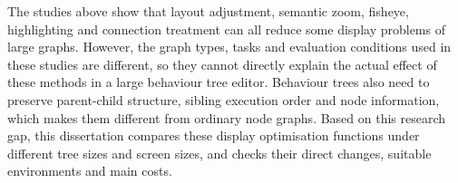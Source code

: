 The studies above show that layout adjustment, semantic zoom, fisheye, highlighting and connection treatment can all reduce some display problems of large graphs. However, the graph types, tasks and evaluation conditions used in these studies are different, so they cannot directly explain the actual effect of these methods in a large behaviour tree editor. Behaviour trees also need to preserve parent-child structure, sibling execution order and node information, which makes them different from ordinary node graphs. Based on this research gap, this dissertation compares these display optimisation functions under different tree sizes and screen sizes, and checks their direct changes, suitable environments and main costs.
